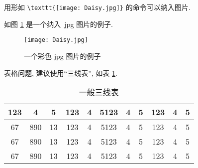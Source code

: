 \documentclass{WHUMaster}   %
\begin{document}
用形如 \verb|\texttt{[image: Daisy.jpg]}| 的命令可以纳入图片.

如图 \ref{fig:1} 是一个纳入~jpg 图片的例子.

\begin{figure}[ht]
\centering
  \texttt{[image: Daisy.jpg]}
  \caption{一个彩色 jpg 图片的例子}
  \label{fig:1}
\end{figure}

表格问题, 建议使用``三线表'', 如表 \ref{tab:1}.

\begin{table}[ht]
\centering
\caption{一般三线表}
\label{tab:1}
    \begin{tabular}{c c c c c c c c c c c}
    \hline
    123 & 4  & 5  & 123 & 4 & 5123 & 4 & 5 & 123 & 4 & 5\\
    \hline
    67 & 890 & 13 & 123 & 4 & 5123 & 4 & 5 & 123 & 4 & 5\\
    67 & 890 & 13 & 123 & 4 & 5123 & 4 & 5 & 123 & 4 & 5\\
    67 & 890 & 13 & 123 & 4 & 5123 & 4 & 5 & 123 & 4 & 5\\
    \hline
    \end{tabular}
\end{table}


%
\end{document}
